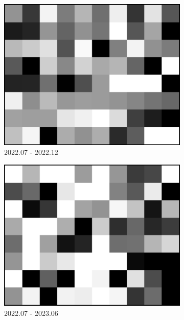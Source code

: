 \documentclass[a4paper,fleqn]{cas-sc}
\begin{document}
\begin{figure}
\begin{subfigure}{0.3\textwidth}
        \centering
        \includegraphics[width=\textwidth]{figure/The azimuth shift/shift_TaklimakanDesert_des_20221227.png}
        \caption{2022.07 - 2022.12}
        \label{fig_7g}
    \end{subfigure}
    \begin{subfigure}{0.3\textwidth}
        \centering
        \includegraphics[width=\textwidth]{figure/The azimuth shift/shift_TaklimakanDesert_des_20230625.png}
        \caption{2022.07 - 2023.06}
        \label{fig_7k}
    \end{subfigure}
    \begin{subfigure}{0.3\textwidth}

\end{subfigure}
\end{figure}
\end{document}
